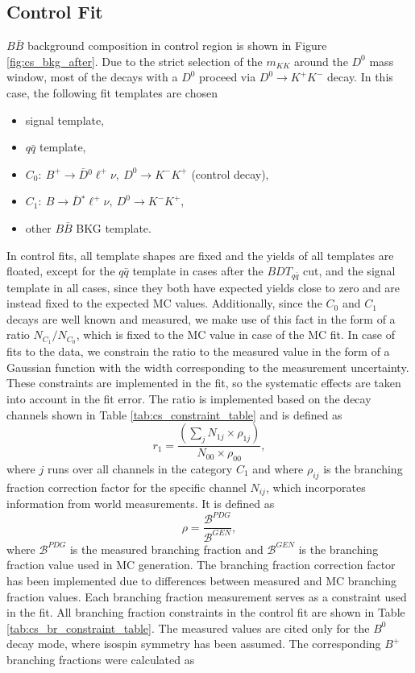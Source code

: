 \subsection{Control Fit}\label{sec:control-fit}
$B \bar B$ background composition in control region is shown in Figure \ref{fig:cs_bkg_after}. Due to the strict selection of the $m_{KK}$ around the $D^0$ mass window, most of the decays with a $D^0$ proceed via $D^0 \to K^+K^-$ decay. In this case, the following fit templates are chosen
\begin{itemize}
	\item signal template,
	\item $q \bar q$ template,
	\item $C_0:~B^+ \to \bar{D} {}^0 \ell^+ \nu,~D^0 \to K^-K^+$ (control decay),
	\item $C_1:~B \to \bar{D} {}^* \ell^+ \nu,~D^0 \to K^-K^+$,
	\item other $B \bar B$ BKG template.
\end{itemize}
In control fits, all template shapes are fixed and the yields of all templates are floated, except for the $q \bar q$ template in cases after the $BDT_{q \bar q}$ cut, and the signal template in all cases, since they both have expected yields close to zero and are instead fixed to the expected MC values. Additionally, since the $C_0$ and $C_1$ decays are well known and measured, we make use of this fact in the form of a ratio $N_{C_1}/N_{C_0}$, which is fixed to the MC value in case of the MC fit. In case of fits to the data, we constrain the ratio to the measured value in the form of a Gaussian function with the width corresponding to the measurement uncertainty. These constraints are implemented in the fit, so the systematic effects are taken into account in the fit error. The ratio is implemented based on the decay channels shown in Table \ref{tab:cs_constraint_table} and is defined as
\begin{equation}
r_1 = \frac{\left(\sum_j N_{1j}\times \rho_{1j} \right)}{N_{00} \times \rho_{00}},
\label{eq:cs_fix}
\end{equation}
where $j$ runs over all channels in the category $C_1$ and where $\rho_{ij}$ is the branching fraction correction factor for the specific channel $N_{ij}$, which incorporates information from world measurements. It is defined as 
\begin{equation}
\rho = \frac{\mathcal{B}^{PDG}}{\mathcal{B}^{GEN}},
\label{eq:br_fix}
\end{equation}
where $\mathcal{B}^{PDG}$ is the measured branching fraction and $\mathcal{B}^{GEN}$ is the branching fraction value used in MC generation. The branching fraction correction factor has been implemented due to differences between measured and MC branching fraction values. Each branching fraction measurement serves as a constraint used in the fit. All branching fraction constraints in the control fit are shown in Table \ref{tab:cs_br_constraint_table}. The measured values are cited only for the $B^0$ decay mode, where isospin symmetry has been assumed. The corresponding $B^+$ branching fractions were calculated as
